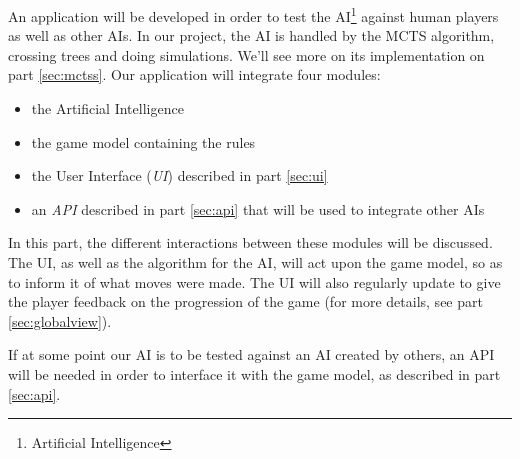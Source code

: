 An application will be developed in order to test the AI\footnote{Artificial Intelligence} against human players as well as other AIs.
In our project, the AI is handled by the MCTS algorithm, crossing trees and doing simulations. We'll see more on its implementation on part \ref{sec:mctss}.
Our application will integrate four modules: 
\begin{itemize}
\item the Artificial Intelligence
\item the game model containing the rules
\item the User Interface (\emph{UI}) described in part \ref{sec:ui}
\item an \emph{API} described in part \ref{sec:api} that will be used to integrate other AIs
\end{itemize}

In this part, the different interactions between these modules will be discussed.
The UI, as well as the algorithm for the AI, will act upon the game model, so as to inform it of what moves were made.
The UI will also regularly update to give the player feedback on the progression of the game (for more details, see part \ref{sec:globalview}).

If at some point our AI is to be tested against an AI created by others, an API will be needed in order to interface it with the game model, as described in part \ref{sec:api}.

